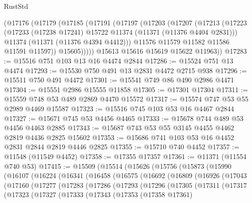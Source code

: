 \begin{lexlean}{RustStd}
\begin{coremodule}
{\begin{coremodule}
{{{{{{{{{{{{{{{{{{{{{{{{{{{{{{{{{      (@17176
        (@17179
          (@17185
            (@17191
              (@17197
                (@17203
                  (@17207
                    (@17213
                      (@17223
                        (@17233 (@17238 @17241) @15722 @11374 (@11371 (@11376 @4404 @2831)))
                        @11374
                        (@11371 (@11376 @4394 @4412)))
                      @11576
                      @11579
                      @11582
                      @11586
                      @11591
                      @11597))
                  @15605)))))
        @15613
        @15616
        @15619
        @15622
        @11963))
@17283 := @15516 @751 @103 @13 @16 @4474 @2844
@17286 := @15524 @751 @13 @4474
@17293 := @15530 @750 @491 @13 @2831 @4472 @2715 @938
@17296 := @15511 @750 @491 @4472
@17301 := @15541 @749 @86 @490 @2986 @4471
@17304 := @15551 @2986 @15555 @11858
@17305 := @17301 @17304
@17311 := @15559 @748 @53 @489 @2869 @4470 @15572
@17317 := @15574 @747 @53 @55 @2989 @4469 @15587
@17323 := @15516 @745 @103 @53 @16 @4467 @2844
@17327 := @15671 @745 @53 @4456 @4465
@17333 := @15678 @744 @489 @53 @4456 @4463 @2885
@17343 := @15687 @743 @53 @55 @3145 @4455 @4462 @2819 @4436 @2825 @15602
@17353 := @15686 @741 @103 @53 @16 @4452 @2831 @2844 @2819 @4446 @2825
@17355 := @15710 @740 @4452
@17357 := @11548 (@11549 @4452)
@17358 := @17355 @17357
@17361 := @11371 (@11554 @740 @53)
@17415 := @15509
    (@15514
      (@15626
        (@15756
          (@15873
            (@15990
              (@16107
                (@16224
                  (@16341
                    (@16458
                      (@16575
                        (@16692
                          (@16809
                            (@16926
                              (@17043
                                (@17160
                                  (@17277
                                    (@17283
                                      (@17286
                                        (@17293
                                          (@17296
                                            (@17305
                                              (@17311
                                                (@17317
                                                  (@17323
                                                    (@17327
                                                      (@17333
                                                        (@17343
                                                          (@17353
                                                            (@17358 @17361)
}}}}}}}}}}}}}}}}}}}}}}}}}}}}}}}}}
\end{coremodule}}
\end{coremodule}
\end{lexlean}
